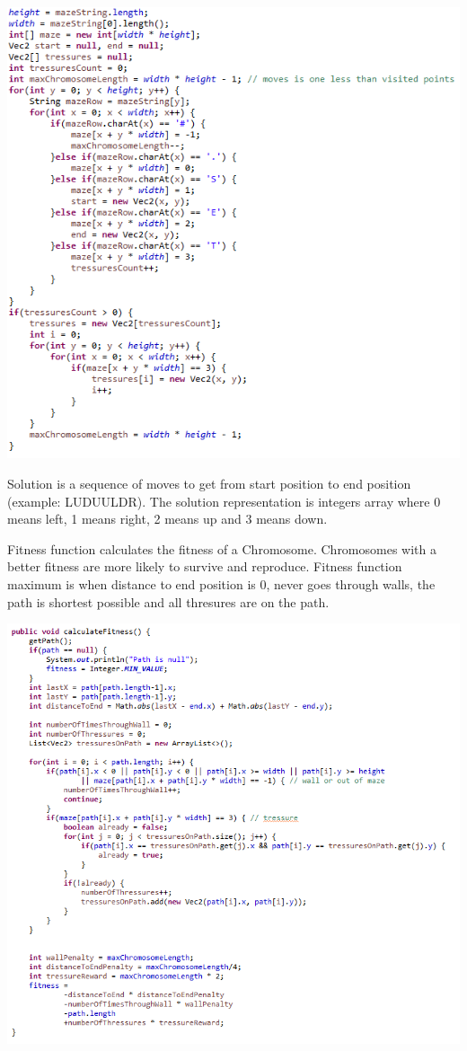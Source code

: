 \documentclass[12pt]{article} %
\begin{document}
\includegraphics{stringToData}

Solution is a sequence of moves to get from start position to end position (example: LUDUULDR). The solution representation is integers array where 0 means left, 1 means right, 2 means up and 3 means down.

Fitness function calculates the fitness of a Chromosome. Chromosomes with a better fitness are more likely to survive and reproduce. Fitness function maximum is when distance to end position is 0, never goes through walls, the path is shortest possible and all thresures are on the path.

\includegraphics[scale=1]{fitnessFunction}
\end{document}
